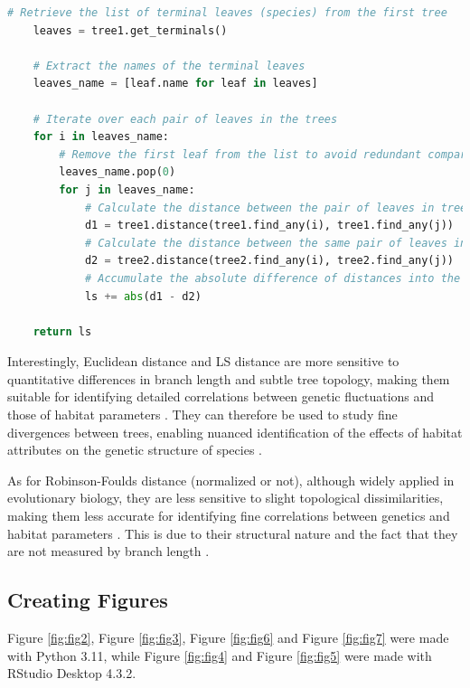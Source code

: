 {\begin{lstlisting}[label=lst:LeastSquare, language=Python, caption=Python script for calculating the LSD using the ete3 package in the aPhyloGeo package]
    # Retrieve the list of terminal leaves (species) from the first tree
    leaves = tree1.get_terminals()
    
    # Extract the names of the terminal leaves
    leaves_name = [leaf.name for leaf in leaves]
    
    # Iterate over each pair of leaves in the trees
    for i in leaves_name:
        # Remove the first leaf from the list to avoid redundant comparisons
        leaves_name.pop(0)
        for j in leaves_name:
            # Calculate the distance between the pair of leaves in tree1
            d1 = tree1.distance(tree1.find_any(i), tree1.find_any(j))
            # Calculate the distance between the same pair of leaves in tree2
            d2 = tree2.distance(tree2.find_any(i), tree2.find_any(j))
            # Accumulate the absolute difference of distances into the LSD
            ls += abs(d1 - d2)
    
    return ls
\end{lstlisting}

Interestingly, Euclidean distance and LS distance are more sensitive to quantitative differences in branch length and subtle tree topology, making them suitable for identifying detailed correlations between genetic fluctuations and those of habitat parameters \citep{czarna2006topology, choi2009comparison}. They can therefore be used to study fine divergences between trees, enabling nuanced identification of the effects of habitat attributes on the genetic structure of species \citep{czarna2006topology, choi2009comparison}.

As for Robinson-Foulds distance (normalized or not), although widely applied in evolutionary biology, they are less sensitive to slight topological dissimilarities, making them less accurate for identifying fine correlations between genetics and habitat parameters \citep{smith2019bayesian, smith2020information}. This is due to their structural nature and the fact that they are not measured by branch length \citep{smith2019bayesian, smith2020information}.

\subsection{Creating Figures}\label{Figures}
Figure \ref{fig:fig2}, Figure \ref{fig:fig3}, Figure \ref{fig:fig6} and Figure \ref{fig:fig7} were made with Python 3.11, while Figure \ref{fig:fig4} and Figure \ref{fig:fig5} were made with RStudio Desktop 4.3.2.

}
